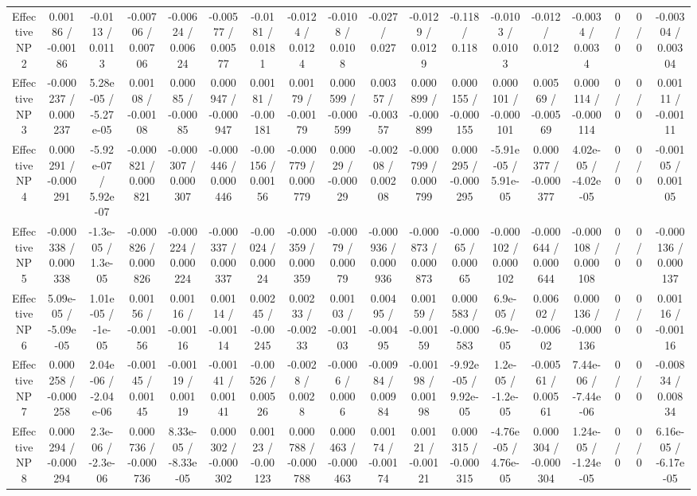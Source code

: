 \documentclass[10pt]{article}
\begin{document}
\begin{table}[htbp]
\begin{center}
\begin{tabular}{|c|c|c|c|c|c|c|c|c|c|c|c|c|c|c|c|c|c|}
  Effective NP 2 & 0.00186 / -0.00186 & -0.0113 / 0.0113 & -0.00706 / 0.00706 & -0.00624 / 0.00624 & -0.00577 / 0.00577 & -0.0181 / 0.0181 & -0.0124 / 0.0124 & -0.0108 / 0.0108 & -0.027 / 0.027 & -0.0129 / 0.0129 & -0.118 / 0.118 & -0.0103 / 0.0103 & -0.012 / 0.012 & -0.0034 / 0.0034 & 0 / 0 & 0 / 0 & -0.00304 / 0.00304 \\ 
  Effective NP 3 & -0.000237 / 0.000237 & 5.28e-05 / -5.27e-05 & 0.00108 / -0.00108 & 0.00085 / -0.00085 & 0.000947 / -0.000947 & 0.00181 / -0.00181 & 0.00179 / -0.00179 & 0.000599 / -0.000599 & 0.00357 / -0.00357 & 0.000899 / -0.000899 & 0.000155 / -0.000155 & 0.000101 / -0.000101 & 0.00569 / -0.00569 & 0.000114 / -0.000114 & 0 / 0 & 0 / 0 & 0.00111 / -0.00111 \\ 
  Effective NP 4 & 0.000291 / -0.000291 & -5.92e-07 / 5.92e-07 & -0.000821 / 0.000821 & -0.000307 / 0.000307 & -0.000446 / 0.000446 & -0.00156 / 0.00156 & -0.000779 / 0.000779 & 0.00029 / -0.00029 & -0.00208 / 0.00208 & -0.000799 / 0.000799 & 0.000295 / -0.000295 & -5.91e-05 / 5.91e-05 & 0.000377 / -0.000377 & 4.02e-05 / -4.02e-05 & 0 / 0 & 0 / 0 & -0.00105 / 0.00105 \\ 
  Effective NP 5 & -0.000338 / 0.000338 & -1.3e-05 / 1.3e-05 & -0.000826 / 0.000826 & -0.000224 / 0.000224 & -0.000337 / 0.000337 & -0.00024 / 0.00024 & -0.000359 / 0.000359 & -0.00079 / 0.00079 & -0.000936 / 0.000936 & -0.000873 / 0.000873 & -0.00065 / 0.00065 & -0.000102 / 0.000102 & -0.000644 / 0.000644 & -0.000108 / 0.000108 & 0 / 0 & 0 / 0 & -0.000136 / 0.000137 \\ 
  Effective NP 6 & 5.09e-05 / -5.09e-05 & 1.01e-05 / -1e-05 & 0.00156 / -0.00156 & 0.00116 / -0.00116 & 0.00114 / -0.00114 & 0.00245 / -0.00245 & 0.00233 / -0.00233 & 0.00103 / -0.00103 & 0.00495 / -0.00495 & 0.00159 / -0.00159 & 0.000583 / -0.000583 & 6.9e-05 / -6.9e-05 & 0.00602 / -0.00602 & 0.000136 / -0.000136 & 0 / 0 & 0 / 0 & 0.00116 / -0.00116 \\ 
  Effective NP 7 & 0.000258 / -0.000258 & 2.04e-06 / -2.04e-06 & -0.00145 / 0.00145 & -0.00119 / 0.00119 & -0.00141 / 0.00141 & -0.00526 / 0.00526 & -0.0028 / 0.0028 & -0.0006 / 0.0006 & -0.00984 / 0.00984 & -0.00198 / 0.00198 & -9.92e-05 / 9.92e-05 & 1.2e-05 / -1.2e-05 & -0.00561 / 0.00561 & 7.44e-06 / -7.44e-06 & 0 / 0 & 0 / 0 & -0.00834 / 0.00834 \\ 
  Effective NP 8 & 0.000294 / -0.000294 & 2.3e-06 / -2.3e-06 & 0.000736 / -0.000736 & 8.33e-05 / -8.33e-05 & 0.000302 / -0.000302 & 0.00123 / -0.00123 & 0.000788 / -0.000788 & 0.000463 / -0.000463 & 0.00174 / -0.00174 & 0.00121 / -0.00121 & 0.000315 / -0.000315 & -4.76e-05 / 4.76e-05 & 0.000304 / -0.000304 & 1.24e-05 / -1.24e-05 & 0 / 0 & 0 / 0 & 6.16e-05 / -6.17e-05 \\ 

\end{tabular}
\end{center}
\end{table}
\end{document}
